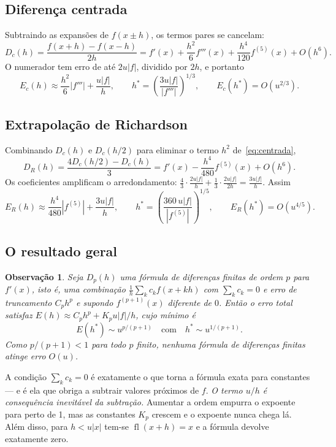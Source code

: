 \documentclass[11pt,a4paper]{article}
\newtheorem{observacao}{Observação}
\newcommand{\fl}{\operatorname{fl}}
\begin{document}
\subsection{Diferença centrada}
Subtraindo as expansões de $f(x\pm h)$, os termos pares se cancelam:
\begin{equation}
D_c(h) = \frac{f(x+h)-f(x-h)}{2h} = f'(x) + \frac{h^2}{6}f'''(x) + \frac{h^4}{120}f^{(5)}(x) + O(h^6).
\label{eq:centrada}
\end{equation}
O numerador tem erro de até $2u|f|$, dividido por $2h$, e portanto
\begin{equation}
E_c(h) \approx \frac{h^2}{6}|f'''| + \frac{u|f|}{h}, \qquad
h^\ast = \left(\frac{3u|f|}{|f'''|}\right)^{1/3}, \qquad E_c(h^\ast) = O(u^{2/3}).
\end{equation}

\subsection{Extrapolação de Richardson}
Combinando $D_c(h)$ e $D_c(h/2)$ para eliminar o termo $h^2$ de~\eqref{eq:centrada},
\begin{equation}
D_R(h) = \frac{4D_c(h/2)-D_c(h)}{3} = f'(x) - \frac{h^4}{480}f^{(5)}(x) + O(h^6).
\end{equation}
Os coeficientes amplificam o arredondamento: $\frac43\cdot\frac{2u|f|}{h} + \frac13\cdot\frac{2u|f|}{2h} = \frac{3u|f|}{h}$. Assim
\begin{equation}
E_R(h)\approx \frac{h^4}{480}|f^{(5)}| + \frac{3u|f|}{h}, \qquad h^\ast = \left(\frac{360\,u|f|}{|f^{(5)}|}\right)^{1/5},\qquad E_R(h^\ast)=O(u^{4/5}).
\end{equation}

\subsection{O resultado geral}
\begin{observacao}
Seja $D_p(h)$ uma fórmula de diferenças finitas de ordem $p$ para $f'(x)$, isto é, uma combinação $\frac1h\sum_k c_k f(x+kh)$ com $\sum_k c_k=0$ e erro de truncamento $C_ph^p$ e supondo $f^{(p+1)}(x)$ diferente de $0$. Então o erro total satisfaz $E(h)\approx C_ph^p + K_pu|f|/h$, cujo mínimo é
\[
E(h^\ast)  \sim u^{p/(p+1)} \quad\text{com}\quad h^\ast \sim u^{1/(p+1)}.
\]
Como $p/(p+1)<1$ para todo $p$ finito, nenhuma fórmula de diferenças finitas atinge erro $O(u)$.
\end{observacao}

A condição $\sum_kc_k=0$ é exatamente o que torna a fórmula exata para constantes --- e é ela que obriga a subtrair valores próximos de $f$. \emph{O termo $u/h$ é consequência inevitável da subtração.} Aumentar a ordem empurra o expoente para perto de 1, mas as constantes $K_p$ crescem e o expoente nunca chega lá. Além disso, para $h<u|x|$ tem-se $\fl(x+h)=x$ e a fórmula devolve exatamente zero.
\end{document}
